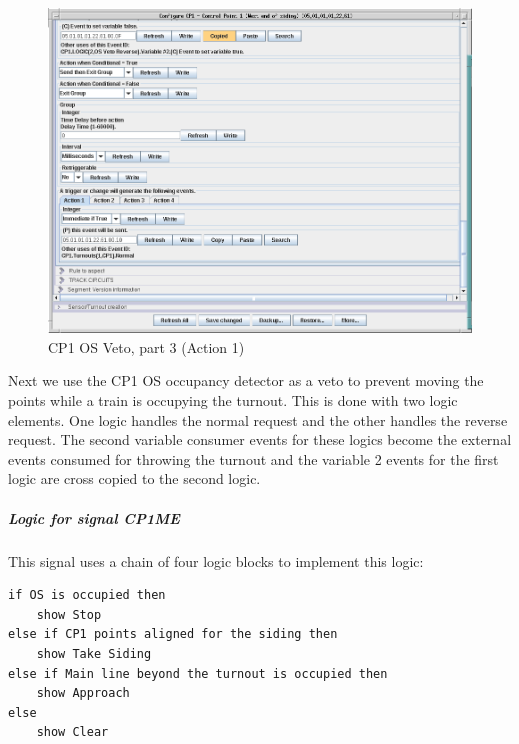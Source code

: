\begin{figure}[hbpt]\begin{centering}%
\includegraphics[width=5in]{CP1-OSVeto-Normal3.png}
\caption{CP1 OS Veto, part 3 (Action 1)}
\label{fig:CP1-OSVeto-Normal3}
\end{centering}\end{figure}                                                    
Next we use the CP1 OS occupancy detector as a veto to prevent moving the 
points while a train is occupying the turnout.  This is done with two logic 
elements.  One logic handles the normal request and the other handles the 
reverse request.  The second variable consumer events for these logics become 
the external events consumed for throwing the turnout and the variable 2 
events for the first logic are cross copied to the second logic.

\clearpage
\subparagraph{Logic for signal CP1ME}
This signal uses a chain of four logic blocks to implement this logic:
\begin{verbatim}
if OS is occupied then
    show Stop
else if CP1 points aligned for the siding then
    show Take Siding
else if Main line beyond the turnout is occupied then
    show Approach
else
    show Clear
\end{verbatim}

